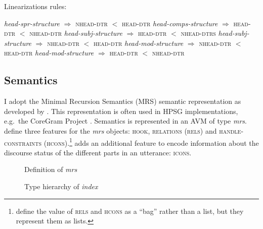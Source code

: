 \begin{exe}\ex Linearizations rules:\label{rule:linearization}
\begin{xlist}
\ex \emph{head-spr-structure} $\Rightarrow$ \textsc{nhead-dtr} $<$ \textsc{head-dtr}
\ex \emph{head-comps-structure} $\Rightarrow$ \textsc{head-dtr} $<$ \textsc{nhead-dtr}
\ex \emph{head-subj-structure} $\Rightarrow$ \textsc{head-dtr}  $<$ \textsc{nhead-dtrs}
\ex \emph{head-subj-structure} $\Rightarrow$ \textsc{nhead-dtr} $<$ \textsc{head-dtr} 
\ex \emph{head-mod-structure} $\Rightarrow$ \textsc{nhead-dtr}  $<$ \textsc{head-dtr}
\ex \emph{head-mod-structure} $\Rightarrow$ \textsc{head-dtr} $<$ \textsc{nhead-dtr} 
\end{xlist}
\end{exe}


\subsection{Semantics}

I adopt the Minimal Recursion Semantics (MRS) semantic representation as developed by \citet{Copestake.2005}. This representation is often used in HPSG implementations, e.g.\ the CoreGram Project \citep{Mueller.S.2015}. %
Semantics is represented in an AVM of type \emph{mrs}. \citet{Copestake.2005} define three features for the \emph{mrs} objects: \textsc{hook, relations (rels)} and \textsc{handle-constraints (hcons)}.\footnote{\citet{Copestake.2005} define the value of \textsc{rels} and \textsc{hcons} as a ``bag'' rather than a list, but they represent them as lists.%
} \citet{Song.2017} adds an additional feature to encode information about the discourse status of the different parts in an utterance: \textsc{icons}.

\begin{figure}[h]
\begin{floatrow}
\captionsetup{margin=.05\linewidth}
\ffigbox
{}
{\caption{Definition of \emph{mrs}}\label{avm:def-mrs}}

{\caption{Type hierarchy of \emph{index}}\label{fig:hrch-index}}
\end{floatrow}
\end{figure}

